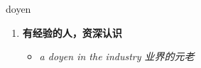 
\begin{frame}
{\huge doyen}
\begin{center}
\begin{enumerate}\Large
  \item \textbf{有经验的人，资深认识}
  \begin{itemize}
    \item \em{\Large{a doyen in the industry 业界的元老}}
  \end{itemize}
\end{enumerate}
\end{center}
\end{frame}
